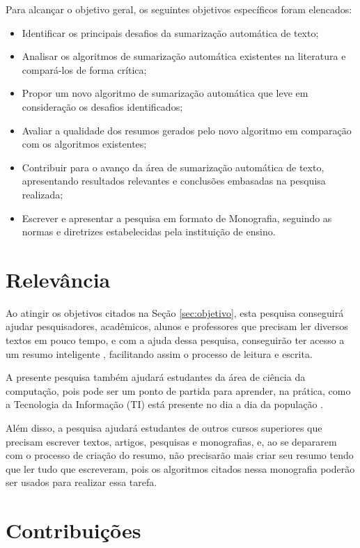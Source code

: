 Para alcançar o objetivo geral, os seguintes objetivos específicos foram elencados:

\begin{itemize}
    \item Identificar os principais desafios da sumarização automática de texto;
    \item Analisar os algoritmos de sumarização automática existentes na literatura e compará-los de forma crítica;
    \item Propor um novo algoritmo de sumarização automática que leve em consideração os desafios identificados;
    \item Avaliar a qualidade dos resumos gerados pelo novo algoritmo em comparação com os algoritmos existentes;
    \item Contribuir para o avanço da área de sumarização automática de texto, apresentando resultados relevantes e conclusões embasadas na pesquisa realizada;
    \item Escrever e apresentar a pesquisa em formato de Monografia, seguindo as normas e diretrizes estabelecidas pela instituição de ensino.
\end{itemize}

\section{Relevância}
\label{sec:relevancia}

Ao atingir os objetivos citados na Seção \ref{sec:objetivo}, esta pesquisa conseguirá ajudar pesquisadores, acadêmicos, alunos e professores que precisam ler diversos textos em pouco tempo, e com a ajuda dessa pesquisa, conseguirão ter acesso a um resumo inteligente \cite{de2004avaliaccao}, facilitando assim o processo de leitura e escrita.

A presente pesquisa também ajudará estudantes da área de ciência da computação, pois pode ser um ponto de partida para aprender, na prática, como a Tecnologia da Informação (TI) está presente no dia a dia da população \cite{margaridosumarizaccao}.

Além disso, a pesquisa ajudará estudantes de outros cursos superiores que precisam escrever textos, artigos, pesquisas e monografias, e, ao se depararem com o processo de criação do resumo, não precisarão mais criar seu resumo tendo que ler tudo que escreveram, pois os algoritmos citados nessa monografia poderão ser usados para realizar essa tarefa.

\section{Contribuições}
\label{sec:contribuicoes}

